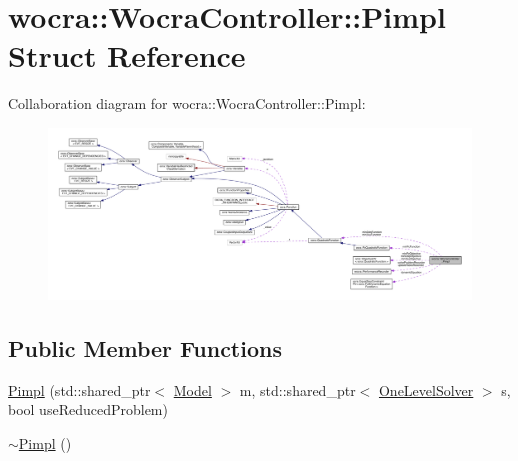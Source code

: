 \hypertarget{structwocra_1_1WocraController_1_1Pimpl}{}\section{wocra\+:\+:Wocra\+Controller\+:\+:Pimpl Struct Reference}
\label{structwocra_1_1WocraController_1_1Pimpl}


Collaboration diagram for wocra\+:\+:Wocra\+Controller\+:\+:Pimpl\+:\nopagebreak
\begin{figure}[H]
\begin{center}
\leavevmode
\includegraphics[width=350pt]{d8/d8f/structwocra_1_1WocraController_1_1Pimpl__coll__graph}
\end{center}
\end{figure}
\subsection*{Public Member Functions}
\begin{DoxyCompactItemize}
\item 
\hyperlink{structwocra_1_1WocraController_1_1Pimpl_ae9e38baadd765c1005354808ea768800}{Pimpl} (std\+::shared\+\_\+ptr$<$ \hyperlink{classocra_1_1Model}{Model} $>$ m, std\+::shared\+\_\+ptr$<$ \hyperlink{classocra_1_1OneLevelSolver}{One\+Level\+Solver} $>$ s, bool use\+Reduced\+Problem)
\item 
\hyperlink{structwocra_1_1WocraController_1_1Pimpl_a9e7ca6582122e345e4d51d30ed481450}{$\sim$\+Pimpl} ()
\end{DoxyCompactItemize}
